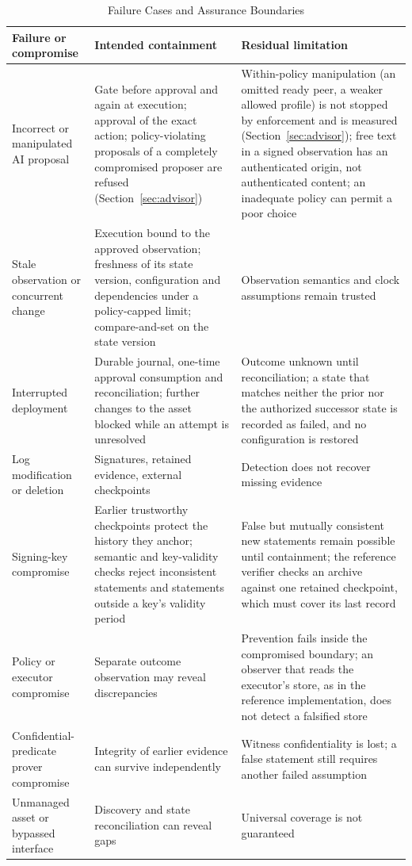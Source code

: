 \documentclass[journal]{IEEEtran}
\begin{document}
\begin{table}[!t]
\caption{Failure Cases and Assurance Boundaries}
\label{tab:failures}
\centering
\begin{tabular}{>{\raggedright\arraybackslash}p{4.2cm}>{\raggedright\arraybackslash}p{5.8cm}>{\raggedright\arraybackslash}p{5.8cm}}
\toprule
Failure or compromise & Intended containment & Residual limitation \\
\midrule
Incorrect or manipulated AI proposal & Gate before approval and again at execution; approval of the exact action; policy-violating proposals of a completely compromised proposer are refused (Section~\ref{sec:advisor}) & Within-policy manipulation (an omitted ready peer, a weaker allowed profile) is not stopped by enforcement and is measured (Section~\ref{sec:advisor}); free text in a signed observation has an authenticated origin, not authenticated content; an inadequate policy can permit a poor choice \\
Stale observation or concurrent change & Execution bound to the approved observation; freshness of its state version, configuration and dependencies under a policy-capped limit; compare-and-set on the state version & Observation semantics and clock assumptions remain trusted \\
Interrupted deployment & Durable journal, one-time approval consumption and reconciliation; further changes to the asset blocked while an attempt is unresolved & Outcome unknown until reconciliation; a state that matches neither the prior nor the authorized successor state is recorded as failed, and no configuration is restored \\
Log modification or deletion & Signatures, retained evidence, external checkpoints & Detection does not recover missing evidence \\
Signing-key compromise & Earlier trustworthy checkpoints protect the history they anchor; semantic and key-validity checks reject inconsistent statements and statements outside a key's validity period & False but mutually consistent new statements remain possible until containment; the reference verifier checks an archive against one retained checkpoint, which must cover its last record \\
Policy or executor compromise & Separate outcome observation may reveal discrepancies & Prevention fails inside the compromised boundary; an observer that reads the executor's store, as in the reference implementation, does not detect a falsified store \\
Confidential-predicate prover compromise & Integrity of earlier evidence can survive independently & Witness confidentiality is lost; a false statement still requires another failed assumption \\
Unmanaged asset or bypassed interface & Discovery and state reconciliation can reveal gaps & Universal coverage is not guaranteed \\
\bottomrule
\end{tabular}
\end{table}
\end{document}
